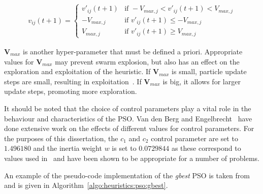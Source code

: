 \begin{equation}
      \label{eq:heuristics:pso:velocity_clamping}
      \begin{split}
            v_{ij}(t+1)=
            \begin{cases}
                  v'_{ij}(t+1) & \text{if } -V_{max,j} < v'_{ij}(t+1) < V_{max,j} \\
                  -V_{max,j}   & \text{if } v'_{ij}(t+1) \leq -V_{max,j}          \\
                  V_{max,j}    & \text{if } v'_{ij}(t+1) \geq V_{max,j}
            \end{cases}
      \end{split}
\end{equation}

$\boldsymbol{V}_{max}$ is another hyper-parameter that must be defined a priori. Appropriate values for $\boldsymbol{V}_{max}$ may prevent swarm explosion, but also has an effect on the exploration and exploitation of the heuristic. If $\boldsymbol{V}_{max}$ is small, particle update steps are small, resulting in exploitation~\cite{ref:eberhart:1996}. If $\boldsymbol{V}_{max}$ is big, it allows for larger update steps, promoting more exploration.

It should be noted that the choice of control parameters play a vital role in the behaviour and characteristics of the \acs{PSO}. Van den Berg and Engelbrecht~\cite{ref:vandenberg:2007, ref:vandenberg:2006} have done extensive work on the effects of different values for control parameters. For the purposes of this dissertation, the $c_{1}$ and $c_{2}$ control parameter are set to $1.496180$ and the inertia weight $w$ is set to $0.0729844$ as these correspond to values used in~\cite{ref:eberhart:2000} and have been shown to be appropriate for a number of problems.

An example of the pseudo-code implementation of the \textit{gbest} \acs{PSO} is taken from~\cite{ref:engelbrecht:2007} and is given in Algorithm~\ref{algo:heuristics:pso:gbest}.

